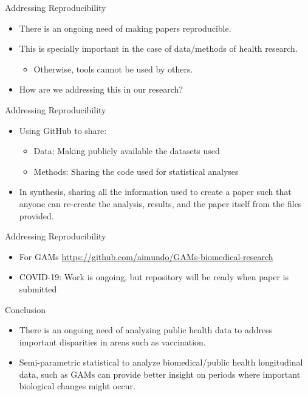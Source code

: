 \documentclass[
  ignorenonframetext,
]{beamer}
\providecommand{\tightlist}{%
  \setlength{\itemsep}{0pt}\setlength{\parskip}{0pt}}\usepackage{longtable,booktabs,array}
\begin{document}
\begin{frame}{Addressing Reproducibility}
\protect\hypertarget{addressing-reproducibility}{}
\begin{itemize}[<+->]
\item
  There is an ongoing need of making papers reproducible.
\item
  This is specially important in the case of data/methods of health
  research.

  \begin{itemize}[<+->]
  \tightlist
  \item
    Otherwise, tools cannot be used by others.
  \end{itemize}
\item
  How are we addressing this in our research?
\end{itemize}
\end{frame}

\begin{frame}{Addressing Reproducibility}
\protect\hypertarget{addressing-reproducibility-1}{}
\begin{itemize}[<+->]
\item
  Using GitHub to share:

  \begin{itemize}[<+->]
  \item
    Data: Making publicly available the datasets used
  \item
    Methods: Sharing the code used for statistical analyses
  \end{itemize}
\item
  In synthesis, sharing all the information used to create a paper such
  that anyone can re-create the analysis, results, and the paper itself
  from the files provided.
\end{itemize}
\end{frame}

\begin{frame}{Addressing Reproducibility}
\protect\hypertarget{addressing-reproducibility-2}{}
\begin{itemize}[<+->]
\item
  For GAMs \url{https://github.com/aimundo/GAMs-biomedical-research}
\item
  COVID-19: Work is ongoing, but repository will be ready when paper is
  submitted
\end{itemize}
\end{frame}

\begin{frame}{Conclusion}
\protect\hypertarget{conclusion}{}
\begin{itemize}[<+->]
\item
  There is an ongoing need of analyzing public health data to address
  important disparities in areas such as vaccination.
\item
  Semi-parametric statistical to analyze biomedical/public health
  longitudinal data, such as GAMs can provide better insight on periods
  where important biological changes might occur.
\end{itemize}
\end{frame}
\end{document}
